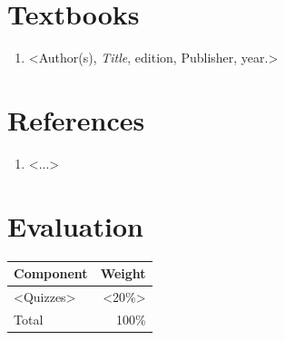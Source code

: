 \documentclass[11pt,a4paper]{article}
\begin{document}
\smallskip
{}


\section*{Textbooks}
\begin{enumerate}
\item <Author(s), \emph{Title}, edition, Publisher, year.>
\end{enumerate}

\section*{References}
\begin{enumerate}
\item <...>
\end{enumerate}

\section*{Evaluation}
\noindent\begin{tabularx}{\textwidth}{@{}Xr@{}}
\toprule
Component & Weight \\
\midrule
<Quizzes> & <20\%> \\
\midrule
Total & 100\% \\
\bottomrule
\end{tabularx}
\end{document}
